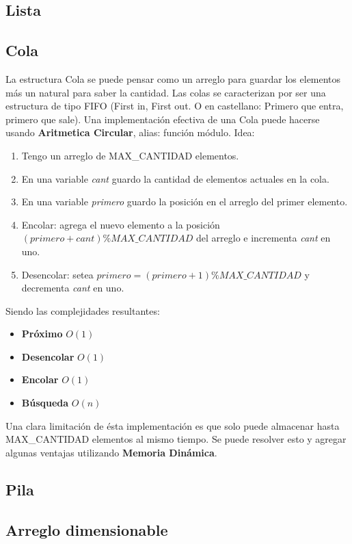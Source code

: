 \subsection{Lista}
\subsection{Cola}

La estructura Cola se puede pensar como un arreglo para guardar los elementos m\'as un natural para saber la cantidad. Las colas se caracterizan por ser una estructura de tipo FIFO (First in, First out. O en castellano: Primero que entra, primero que sale).
Una implementaci\'on efectiva de una Cola puede hacerse usando \textbf{Aritmetica Circular}, alias: funci\'on m\'odulo. Idea:
\begin{enumerate}
 \item Tengo un arreglo de MAX\_CANTIDAD elementos.
 \item En una variable \textit{cant} guardo la cantidad de elementos actuales en la cola.
 \item En una variable \textit{primero} guardo la posici\'on en el arreglo del primer elemento.
 \item Encolar: agrega el nuevo elemento a la posici\'on $(primero + cant) \% MAX\_CANTIDAD$ del arreglo e  incrementa \textit{cant} en uno.
 \item Desencolar: setea $primero=(primero + 1) \% MAX\_CANTIDAD$ y decrementa \textit{cant} en uno.
\end{enumerate}
Siendo las complejidades resultantes:
\begin{itemize}
 \item \textbf{Pr\'oximo} $O(1)$
 \item \textbf{Desencolar} $O(1)$
 \item \textbf{Encolar} $O(1)$
 \item \textbf{B\'usqueda} $O(n)$
\end{itemize}
Una clara limitaci\'on de \'esta implementaci\'on es que solo puede almacenar hasta MAX\_CANTIDAD elementos al mismo tiempo. Se puede resolver esto y agregar algunas ventajas utilizando \textbf{Memoria Din\'amica}.

\subsection{Pila}
\subsection{Arreglo dimensionable}

